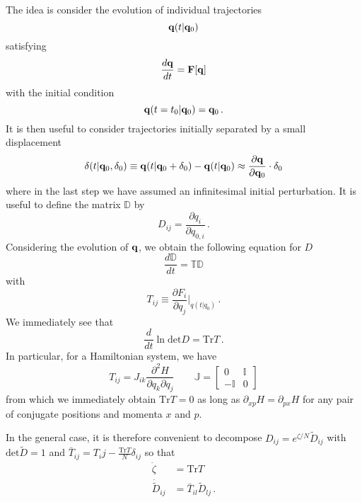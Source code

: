 \documentclass{article}
\begin{document}
The idea is consider the evolution of individual trajectories
\begin{equation}
  {\bf q}(t|{\bf q}_0)
\end{equation}
satisfying
\begin{equation}
  \frac{d{\bf q}}{dt} = {\bf F}[{\bf q}]
\end{equation}
with the initial condition
\begin{equation}
  {\bf q}(t=t_0|{\bf q}_0) = {\bf q}_0 \, .
\end{equation}
It is then useful to consider trajectories initially separated by a small displacement
\begin{equation}
  {\bf \delta}(t|{\bf q}_0,{\bf \delta}_0) \equiv {\bf q}(t|{\bf q}_0 + {\bf \delta}_0) - {\bf q}(t|{\bf q}_0) \approx \frac{\partial{\bf q}}{\partial{\bf q}_0}\cdot{\bf \delta}_0
\end{equation}
where in the last step we have assumed an infinitesimal initial perturbation.
It is useful to define the matrix $\mathbb{D}$ by
\begin{equation}
  D_{ij} = \frac{\partial q_i}{\partial q_{0,i}} \, .
\end{equation}
Considering the evolution of ${\bf q}$, we obtain the following equation for $D$
\begin{equation}
  \frac{d\mathbb{D}}{dt} = \mathbb{T}\mathbb{D}
\end{equation}
with
\begin{equation}
  T_{ij} \equiv \frac{\partial F_i}{\partial q_j}\bigg|_{q(t|q_0)} \, .
\end{equation}
We immediately see that
\begin{equation}
  \frac{d}{dt}\ln\mathrm{det}D = \mathrm{Tr}T \, .
\end{equation}
In particular, for a Hamiltonian system, we have
\begin{equation}
  T_{ij} = J_{ik}\frac{\partial^2H}{\partial q_k\partial q_j} \qquad \mathbb{J} = \left[\begin{array}{cc} 0 & \mathbb{I} \\ -\mathbb{I} & 0 \end{array}\right]
\end{equation}
from which we immediately obtain $\mathrm{Tr}T = 0$ as long as $\partial_{xp}H = \partial_{px}H$ for any pair of conjugate positions and momenta $x$ and $p$.

In the general case, it is therefore convenient to decompose $D_{ij} = e^{\zeta / N}\tilde{D}_{ij}$ with $\mathrm{det}\tilde{D} = 1$ and $\bar{T}_{ij} = T_ij - \frac{\mathrm{Tr}T}{N}\delta_{ij}$ so that
\begin{align}
  \dot{\zeta} &= \mathrm{Tr}T \\
  \dot{\tilde{D}}_{ij} &= \bar{T}_{il}\tilde{D}_{lj} \, .
\end{align}
\end{document}
